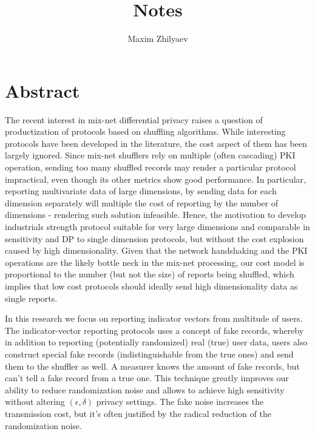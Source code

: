 \documentclass[11pt]{article}
\title{Notes}
\author{Maxim Zhilyaev}
\begin{document}
\maketitle

\section{Abstract}
The recent interest in mix-net differential privacy raises a question of productization of protocols based on shuffling algorithms. While interesting protocols have been developed in the literature, the cost aspect of them has been largely ignored.  Since mix-net shufflers rely on multiple (often cascading) PKI operation, sending too many shuffled records may render a particular protocol impractical, even though its other metrics show good performance.  In particular, reporting multivariate data  of large dimensions, by sending data for each dimension separately will multiple the cost of reporting by the number of dimensions - rendering such solution infeasible.  Hence, the motivation to develop industrials strength protocol suitable for very large dimensions and comparable in sensitivity and DP to single dimension protocols, but without the cost explosion caused by high dimensionality.  Given that the network handshaking and the PKI operations are the likely bottle neck in the mix-net processing, our cost model is proportional to the number (but not the size) of reports being shuffled, which implies that low cost protocols should ideally send high dimensionality data as single reports. 

In this research we focus on reporting indicator vectors from multitude of users.  The indicator-vector reporting protocols uses a concept of fake records, whereby in addition to reporting (potentially randomized) real (true) user data, users also construct special fake records (indistinguishable from the true ones) and send them to the shuffler as well.  A measurer knows the amount of fake records, but can't tell a fake record from a true one. This technique greatly improves our ability to reduce randomization noise  and allows to achieve high sensitivity without altering $(\epsilon,\delta)$ privacy settings. The fake noise increases the transmission cost, but it's often justified by the radical reduction of the randomization noise.
\end{document}
